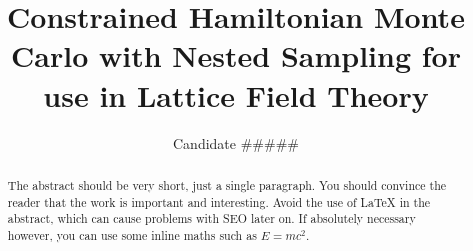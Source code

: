 \documentclass[aps,prd,reprint,preprintnumbers,showpacs,floatfix,nofootinbib,superscript address]{revtex4-2}
\begin{document}
\title{Constrained Hamiltonian Monte Carlo with Nested Sampling for use in Lattice Field Theory}

\author{Candidate \#\#\#\#\#}

\begin{abstract}
	The abstract should be very short, just a single paragraph. You should convince the reader that the work is important and interesting. Avoid the use of \LaTeX{} in the abstract, which can cause problems with SEO later on. If absolutely necessary however, you can use some inline maths such as $E=mc^2$.
\end{abstract}


\maketitle















\end{document}
